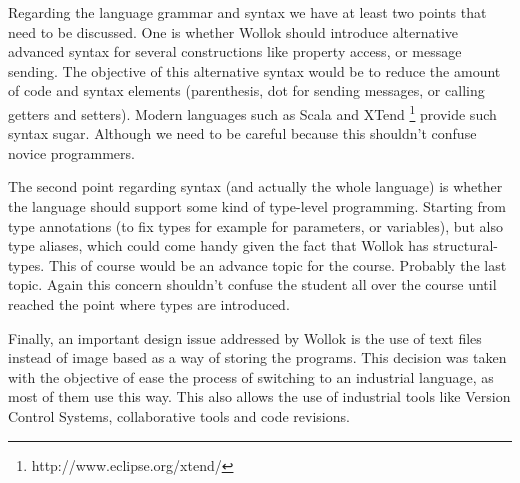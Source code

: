 \medskip
Regarding the language grammar and syntax we have at least two points that need
to be discussed. One is whether Wollok should introduce alternative
advanced syntax for several constructions like property access, or message
sending. The objective of this alternative syntax would be to reduce the amount
of code and syntax elements (\eg parenthesis, dot for sending messages, or calling getters and
setters). Modern languages such as Scala\cite{Oder04a} and
XTend \footnote{http://www.eclipse.org/xtend/} provide such syntax sugar.
Although we need to be careful because this shouldn't confuse novice programmers.

The second point regarding syntax (and actually the whole language) is whether
the language should support some kind of type-level programming. Starting from
type annotations (to fix types for example for parameters, or variables), but
also type aliases, which could come handy given the fact that Wollok has
structural-types. This of course would be an advance topic for the course.
Probably the last topic. Again this concern shouldn't confuse the student all
over the course until reached the point where types are introduced.

Finally, an important design issue addressed by Wollok is the use of text files instead of image
 based as a way of storing the programs. This decision was taken with the objective of ease the 
process of switching to an industrial language, as most of them use this way. 
This also allows the use of industrial tools like Version Control Systems, collaborative tools 
and code revisions.

